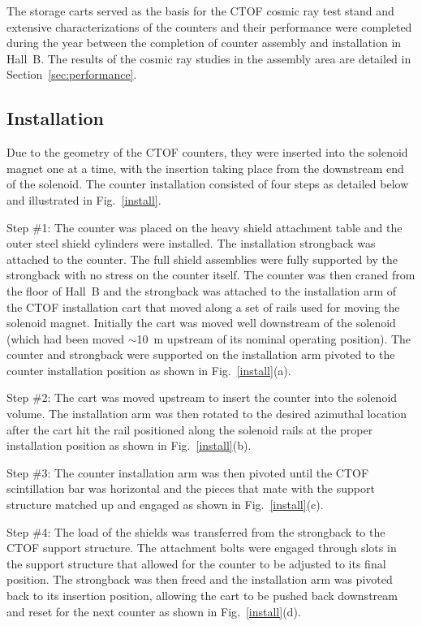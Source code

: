 \documentclass{elsart}
\begin{document}
The storage carts served as the basis for the CTOF cosmic ray test stand and extensive 
characterizations of the counters and their performance were completed during the year between 
the completion of counter assembly and installation in Hall~B. The results of the cosmic ray 
studies in the assembly area are detailed in Section~\ref{sec:performance}.

\subsection{Installation}
\label{installation}

Due to the geometry of the CTOF counters, they were inserted into the solenoid magnet one at a 
time, with the insertion taking place from the downstream end of the solenoid. The counter 
installation consisted of four steps as detailed below and illustrated in Fig.~\ref{install}.

Step \#1: The counter was placed on the heavy shield attachment table and the outer steel shield
cylinders were installed. The installation strongback was attached to the counter. The full shield 
assemblies were fully supported by the strongback with no stress on the counter itself. The 
counter was then craned from the floor of Hall~B and the strongback was attached to the installation
arm of the CTOF installation cart that moved along a set of rails used for moving the solenoid magnet.
Initially the cart was moved well downstream of the solenoid (which had been moved $\sim$10~m
upstream of its nominal operating position). The counter and strongback were supported on the
installation arm pivoted to the counter installation position as shown in Fig.~\ref{install}(a).

Step \#2: The cart was moved upstream to insert the counter into the solenoid volume. The
installation arm was then rotated to the desired azimuthal location after the cart hit the rail
positioned along the solenoid rails at the proper installation position as shown in Fig.~\ref{install}(b).

Step \#3: The counter installation arm was then pivoted until the CTOF scintillation bar was horizontal
and the pieces that mate with the support structure matched up and engaged as shown in Fig.~\ref{install}(c).

Step \#4: The load of the shields was transferred from the strongback to the CTOF support structure.
The attachment bolts were engaged through slots in the support structure that allowed for the counter to
be adjusted to its final position. The strongback was then freed and the installation arm was pivoted back
to its insertion position, allowing the cart to be pushed back downstream and reset for the next counter as
shown in Fig.~\ref{install}(d).
\end{document}
